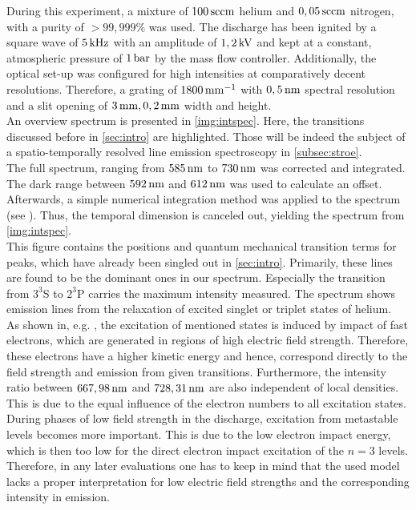 \documentclass[a4paper,10pt,twoside]{article}
\begin{document}
			During this experiment, a mixture of $\unit[100]{sccm}$ helium and $\unit[0,05]{sccm}$ nitrogen, with a purity of $>99,999\%$ was used. The discharge has been ignited by a square wave of $\unit[5]{kHz}$ with an amplitude of $\unit[1,2]{kV}$ and kept at a constant, atmospheric pressure of $\unit[1]{bar}$ by the mass flow controller. Additionally, the optical set-up was configured for high intensities at comparatively decent resolutions. Therefore, a grating of $\unit[1800]{mm^{-1}}$ with $\unit[0,5]{nm}$ spectral resolution and a slit opening of $\unit[3]{mm}, \unit[0,2]{mm}$ width and height.\\ 
			An overview spectrum is presented in \autoref{img:intspec}. Here, the transitions discussed before in \autoref{sec:intro} are highlighted. Those will be indeed the subject of a spatio-temporally resolved line emission spectroscopy in \autoref{subsec:stroe}.\\
			The full spectrum, ranging from $\unit[585]{nm}$ to $\unit[730]{nm}$ was corrected and integrated. The dark range between $\unit[592]{nm}$ and $\unit[612]{nm}$ was used to calculate an offset. Afterwards, a simple numerical integration method was applied to the spectrum (see \cite{Wiki:Euler}). Thus, the temporal dimension is canceled out, yielding the spectrum from \autoref{img:intspec}.\\
			This figure contains the positions and quantum mechanical transition terms for peaks, which have already been singled out in \autoref{sec:intro}. Primarily, these lines are found to be the dominant ones in our spectrum. Especially the transition from $3^3$S to $2^3$P carries the maximum intensity measured. The spectrum shows emission lines from the relaxation of excited singlet or triplet states of helium.\\
			As shown in, e.g. \cite{linratio1_14}, the excitation of mentioned states is induced by impact of fast electrons, which are generated in regions of high electric field strength. Therefore, these electrons have a higher kinetic energy and hence, correspond directly to the field \newline strength and emission from given transitions. Furthermore, the intensity ratio between $\unit[667,98]{nm}$ and $\unit[728,31]{nm}$ are also independent of local densities. This is due to the equal influence of the electron numbers to all excitation states.\\
			During phases of low field strength in the discharge, excitation from metastable levels becomes more important. This is due to the low electron impact energy, which is then too low for the direct electron impact excitation of the $n=3$ levels. Therefore, in any later evaluations one has to keep in mind that the used model lacks a proper interpretation for low electric field strengths and the corresponding intensity in emission.\\
\end{document}

